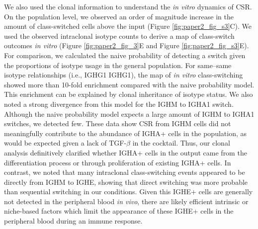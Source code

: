 We also used the clonal information to understand the \textit{in vitro} dynamics of CSR. On the population level, we observed an order of magnitude increase in the amount of class-switched cells above the input (Figure \ref{fig:paper2_fig_s3}C). We used the observed intraclonal isotype counts to derive a map of class-switch outcomes \textit{in vitro} (Figure \ref{fig:paper2_fig_3}E and Figure \ref{fig:paper2_fig_s3}E). For comparison, we calculated the naive probability of detecting a switch given the proportions of isotype usage in the general population. For same–same isotype relationships (i.e., IGHG1 IGHG1), the map of \textit{in vitro} class-switching showed more than 10-fold enrichment compared with the naive probability model. This enrichment can be explained by clonal inheritance of isotype status. We also noted a strong divergence from this model for the IGHM to IGHA1 switch. Although the naive probability model expects a large amount of IGHM to IGHA1 switches, we detected few. These data show CSR from IGHM cells did not meaningfully contribute to the abundance of IGHA+ cells in the population, as would be expected given a lack of TGF-$\beta$ in the cocktail\cite{stavnezer_surprising_2009}. Thus, our clonal analysis definitively clarified whether IGHA+ cells in the output came from the differentiation process or through proliferation of existing IGHA+ cells. In contrast, we noted that many intraclonal class-switching events appeared to be directly from IGHM to IGHE, showing that direct switching was more probable than sequential switching in our conditions. Given this IGHE+ cells are generally not detected in the peripheral blood \textit{in vivo}, there are likely efficient intrinsic or niche-based factors which limit the appearance of these IGHE+ cells in the peripheral blood during an immune response.

